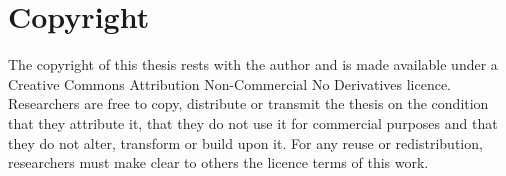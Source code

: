 \chapter*{Copyright}

The copyright of this thesis rests with the author
and is made available under a Creative Commons Attribution Non-Commercial No Derivatives licence.
Researchers are free to copy, distribute or transmit the thesis
on the condition that they attribute it,
that they do not use it for commercial purposes
and that they do not alter, transform or build upon it.
For any reuse or redistribution, 
researchers must make clear to others the licence terms of this work.
